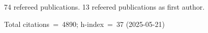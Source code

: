 74 refereed publications. 13 refeered publications as first author.

Total citations~=~4890; h-index~=~37 (2025-05-21)
